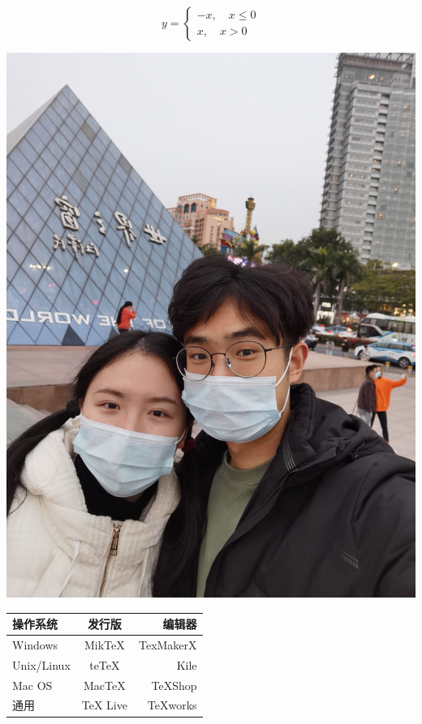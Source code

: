 \documentclass[UTF8]{ctexart}
\begin{document}
\[ y= \begin{cases}
    -x,\quad x\leq 0 \\
    x,\quad x>0
    \end{cases} \]

\includegraphics[width=.8\textwidth]{img/a.jpg}



\begin{tabular}{|l|c|r|}
    \hline
   操作系统& 发行版& 编辑器\\
    \hline
   Windows & MikTeX & TexMakerX \\
    \hline
   Unix/Linux & teTeX & Kile \\
    \hline
   Mac OS & MacTeX & TeXShop \\
    \hline
   通用& TeX Live & TeXworks \\
    \hline
\end{tabular}
\end{document}
